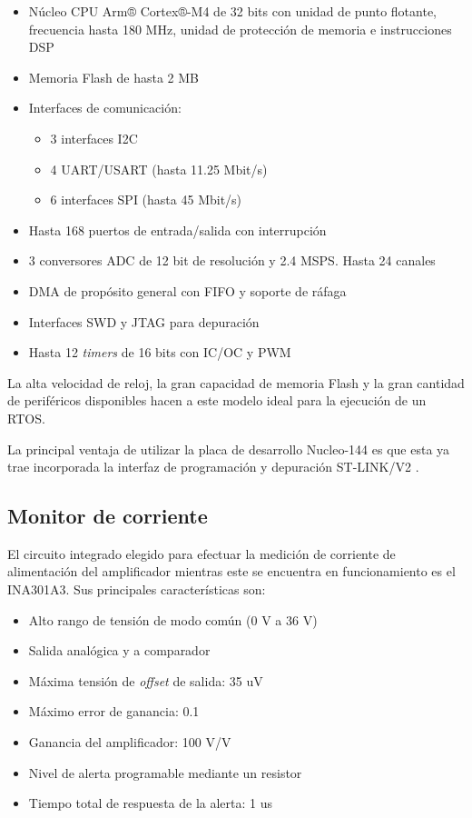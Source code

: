 \begin{itemize}
\item Núcleo CPU Arm® Cortex®-M4 de 32 bits con unidad de punto flotante, frecuencia hasta 180 MHz, unidad de protección de memoria e instrucciones DSP
\item Memoria Flash de hasta 2 MB
\item Interfaces de comunicación:
	\begin{itemize}
	\item 3 interfaces I2C
	\item 4 UART/USART (hasta 11.25 Mbit/s)
	\item 6 interfaces SPI (hasta 45 Mbit/s)
	\end{itemize}
\item Hasta 168 puertos de entrada/salida con interrupción
\item 3 conversores ADC de 12 bit de resolución y 2.4 MSPS. Hasta 24 canales
\item DMA de propósito general con FIFO y soporte de ráfaga
\item Interfaces SWD y JTAG para depuración
\item Hasta 12 \textit{timers} de 16 bits con IC/OC y PWM
\end{itemize}

La alta velocidad de reloj, la gran capacidad de memoria Flash y la gran cantidad de periféricos disponibles hacen a este modelo ideal para la ejecución de un RTOS.

La principal ventaja de utilizar la placa de desarrollo Nucleo-144 es que esta ya trae incorporada la interfaz de programación y depuración ST-LINK/V2 \citep{NUCLEO144}.

\subsection{Monitor de corriente}

El circuito integrado elegido para efectuar la medición de corriente de alimentación del amplificador mientras este se encuentra en funcionamiento es el INA301A3. Sus principales características son:

\begin{itemize}
\item Alto rango de tensión de modo común (0 V a 36 V)
\item Salida analógica y a comparador
\item Máxima tensión de \textit{offset} de salida: 35 uV
\item Máximo error de ganancia: 0.1%
\item Ganancia del amplificador: 100 V/V
\item Nivel de alerta programable mediante un resistor
\item Tiempo total de respuesta de la alerta: 1 us
\end{itemize}

